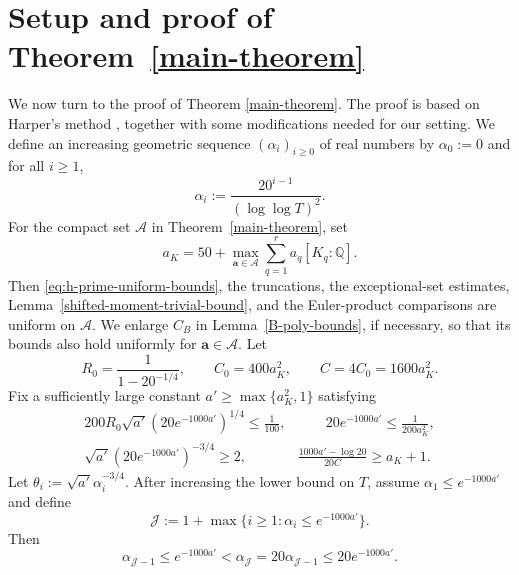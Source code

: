 \documentclass[twoside,reqno,11pt,a4paper]{amsart}
\numberwithin{equation}{section}
\theoremstyle{plain}
\theoremstyle{definition}
\theoremstyle{remark}
\renewcommand{\le}{\leqslant}
\renewcommand{\ge}{\geqslant}
\renewcommand{\geq}{\geqslant}
\begin{document}
		\section{Setup and proof of Theorem~\ref{main-theorem}}\label{sec:parameter-accounting}
We now turn to the proof of Theorem \ref{main-theorem}. The proof is based on Harper's method \cite{Harper}, together with some modifications needed for our setting.
	We define an increasing geometric sequence $\left(\alpha_i\right)_{i\geq0}$ of real numbers by $\alpha_0:= 0$ and for all $i\geqslant 1$, \begin{equation*}
		\alpha_i:= \frac{20^{i-1}}{(\log \log T)^2}.
	\end{equation*}
For the compact set $\mathcal A$ in Theorem~\ref{main-theorem}, set
    \begin{equation*}
        a_K=50+\max_{\mathbf a\in\mathcal A}
        \sum_{q=1}^ra_q[K_q:\mathbb Q].
    \end{equation*}
Then \eqref{eq:h-prime-uniform-bounds}, the truncations, the exceptional-set
estimates, Lemma~\ref{shifted-moment-trivial-bound}, and the Euler-product
comparisons are uniform on $\mathcal A$.
We enlarge $C_B$ in Lemma~\ref{B-poly-bounds}, if necessary, so that its
bounds also hold uniformly for $\mathbf a\in\mathcal A$.
Let
    \begin{equation*}
        R_0=\frac{1}{1-20^{-1/4}},
        \qquad
        C_0=400a_K^2,
        \qquad
        C=4C_0=1600a_K^2.
    \end{equation*}
Fix a sufficiently large constant $a'\ge\max\{a_K^2,1\}$ satisfying
    \begin{align}
200R_0\sqrt{a'}\left(20e^{-1000a'}\right)^{1/4}
        \le\frac1{100}, &\qquad   20e^{-1000a'}\le\frac{1}{200a_K^2},\nonumber\\
\sqrt{a'}\left(20e^{-1000a'}\right)^{-3/4}\ge2, \qquad  & \frac{1000a'-\log20}{20C}\ge a_K+1.
  \label{eq:fixed-parameter-conditions}
    \end{align}
    Let $\theta_i:=\sqrt{a'}\alpha_i^{-3/4}$.  After increasing the lower
    bound on $T$, assume $\alpha_1\le e^{-1000a'}$ and define
    \begin{equation*}
    \mathcal J:=1+\max\{i\ge1:\alpha_i\le e^{-1000a'}\}.
    \end{equation*}
    Then
    \begin{equation}\label{eq:terminal-alpha-block}
    \alpha_{\mathcal J-1}\le e^{-1000a'}
    <\alpha_{\mathcal J}=20\alpha_{\mathcal J-1}
    \le20e^{-1000a'}.
    \end{equation}
\end{document}
